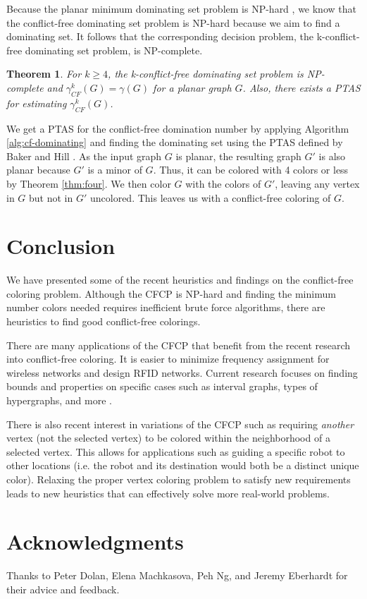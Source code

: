 \documentclass{sig-alternate}
\newtheorem{theorem}{Theorem}
\begin{document}
Because the planar minimum dominating set problem is NP-hard \cite{garey2002computers}, we know that the conflict-free dominating set problem is NP-hard because we aim to find a dominating set. It follows that the corresponding decision problem, the k-conflict-free dominating set problem, is NP-complete.

\begin{theorem} \label{thm:approximate-cfds}
For $k \geq 4$, the k-conflict-free dominating set problem is NP-complete and $\gamma_{CF}^k(G) = \gamma(G)$ for a planar graph $G$. Also, there exists a PTAS for estimating $\gamma_{CF}^k(G)$.
\end{theorem}

We get a PTAS for the conflict-free domination number by applying Algorithm \ref{alg:cf-dominating} and finding the dominating set using the PTAS defined by Baker and Hill \cite{baker1994approximation}. As the input graph $G$ is planar, the resulting graph $G'$ is also planar because $G'$ is a minor of $G$. Thus, it can be colored with 4 colors or less by Theorem \ref{thm:four}. We then color $G$ with the colors of $G'$, leaving any vertex in $G$ but not in $G'$ uncolored. This leaves us with a conflict-free coloring of $G$.

\vspace{-0.15cm}

\section{Conclusion}
\label{sec:conclusion}
We have presented some of the recent heuristics and findings on the conflict-free coloring problem. Although the CFCP is NP-hard and finding the minimum number colors needed requires inefficient brute force algorithms, there are heuristics to find good conflict-free colorings.

There are many applications of the CFCP that benefit from the recent research into conflict-free coloring. It is easier to minimize frequency assignment for wireless networks and design RFID networks. Current research focuses on finding bounds and properties on specific cases such as interval graphs, types of hypergraphs, and more \cite{cheilaris2014strong,smorodinsky2013conflict}.

There is also recent interest in variations of the CFCP such as requiring \emph{another} vertex (not the selected vertex) to be colored within the neighborhood of a selected vertex. This allows for applications such as guiding a specific robot to other locations (i.e. the robot and its destination would both be a distinct unique color). Relaxing the proper vertex coloring problem to satisfy new requirements leads to new heuristics that can effectively solve more real-world problems.

\vspace{-0.15cm}


\section{Acknowledgments}
Thanks to Peter Dolan, Elena Machkasova, Peh Ng, and Jeremy Eberhardt for their advice and feedback.

\vspace{-0.15cm}




\end{document}
